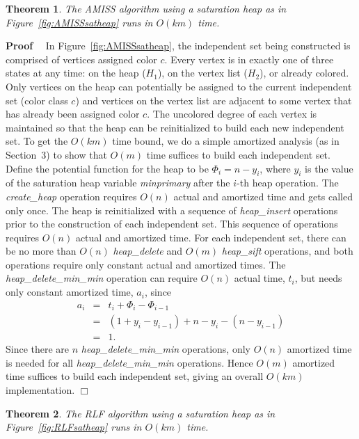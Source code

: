 \newtheorem{amiss}{Theorem}[section]
\begin{amiss}
\label{thm:amiss}
The AMISS algorithm using a saturation heap as in 
Figure~\ref{fig:AMISSsatheap} runs in $O(km)$ time.
\end{amiss}

\noindent
{\bf Proof} \ \
In Figure~\ref{fig:AMISSsatheap}, the independent set being constructed is 
comprised of vertices assigned color $c$.  Every vertex is in exactly one of 
three states at any time: on the heap ($H_1$), on the vertex list ($H_2$), or 
already colored.  Only vertices on the heap can potentially be assigned to the 
current independent set (color class $c$) and vertices on the vertex list are
adjacent to some vertex that has already been assigned color $c$.  The uncolored
degree of each vertex is maintained so that the heap can be reinitialized to 
build each new independent set.  To get the $O(km)$ time bound, we do a simple 
amortized analysis (as in Section~3) to show that $O(m)$ time suffices to 
build each independent set. Define the potential function for the heap to be 
$\Phi_i = n - y_i$, where $y_i$ is the value of the saturation heap variable 
{\em minprimary\/} after the $i$-th heap operation.  The {\em create\_heap\/} 
operation requires $O(n)$ actual and amortized time and gets called only 
once.  The heap is reinitialized with a sequence of {\em heap\_insert\/} 
operations prior to the construction of each independent set.  This sequence 
of operations requires $O(n)$ actual and amortized time.  For each independent 
set, there can be no more than $O(n)$ {\em heap\_delete\/} and $O(m)$ 
{\em heap\_sift\/} operations, and both operations require only constant 
actual and amortized times.  The {\em heap\_delete\_min\_min\/} operation can 
require $O(n)$ actual time, $t_i$, but needs only constant amortized time, 
$a_i$, since
\begin{eqnarray*}
 a_i & = & t_i + \Phi_i - \Phi_{i-1} \\
     & = & (1 + y_i - y_{i-1}) + n - y_i  - (n - y_{i-1}) \\
     & = & 1.
\end{eqnarray*}
Since there are $n$ {\em heap\_delete\_min\_min\/} operations, only $O(n)$ 
amortized time is needed for all {\em heap\_delete\_min\_min\/} operations.  
Hence $O(m)$ amortized time suffices to build each independent set, giving an 
overall $O(km)$ implementation.
\hfill $\Box$
\medskip

\newtheorem{rlf}[amiss]{Theorem}
\begin{rlf}
\label{thm:rlf}
The RLF algorithm using a saturation heap as in Figure~\ref{fig:RLFsatheap} runs
in $O(km)$ time.
\end{rlf}

